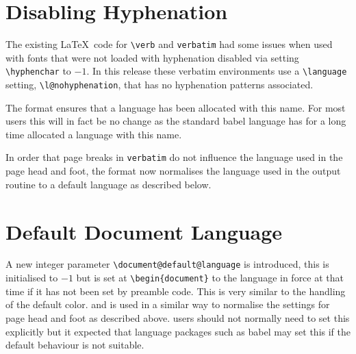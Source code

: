 \documentclass{ltnews}
\begin{document}
\section{Disabling Hyphenation}
The existing \LaTeX\ code for \verb|\verb| and \verb|verbatim| had some
issues when used with fonts that were not loaded with hyphenation
disabled via setting \verb|\hyphenchar| to $-1$. In this release these
verbatim environments use a \verb|\language| setting,
\verb|\l@nohyphenation|, that has no hyphenation patterns associated. 

The format ensures that  a language has been allocated with this name.
For most users this will in fact be no change as the standard
\textsf{babel} language has for a long time allocated a language with
this name.

In order that page breaks in \texttt{verbatim} do not influence the
language used in the page head and foot, the format now normalises the
language used in the output routine to a default language as described
below.
 

\section{Default Document Language}

A new integer parameter \verb|\document@default@language| is
introduced, this is initialised to $-1$ but is set at
\verb|\begin{document}| to the language in force at that time if it
  has not been set by preamble code. This is very similar to the
  handling of the default color.  and is used in a similar way to
  normalise the settings for page head and foot as described above.
users should not normally need to set this explicitly but it expected that
language packages such as \textsf{babel} may set this if the default
behaviour is not suitable.
\end{document}
